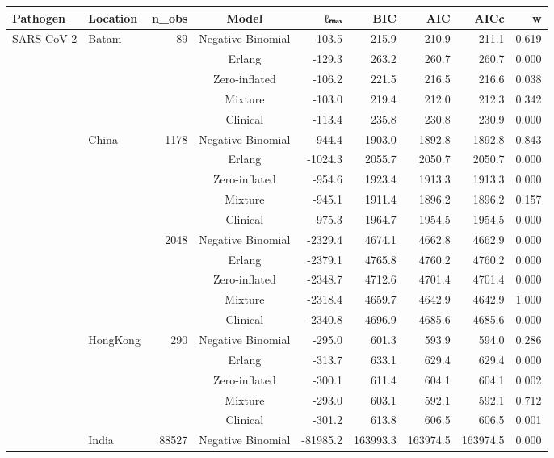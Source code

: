 \begin{table}[ht]
\centering
\begin{tabular}{llrcrrrrr}
  \hline
Pathogen & Location & n_obs & Model & ℓₘₐₓ & BIC & AIC & AICc & w \\ 
  \hline
SARS-CoV-2 & Batam & 89 & Negative Binomial & -103.5 & 215.9 & 210.9 & 211.1 & 0.619 \\ 
   &  &  & Erlang & -129.3 & 263.2 & 260.7 & 260.7 & 0.000 \\ 
   &  &  & Zero-inflated & -106.2 & 221.5 & 216.5 & 216.6 & 0.038 \\ 
   &  &  & Mixture & -103.0 & 219.4 & 212.0 & 212.3 & 0.342 \\ 
   &  &  & Clinical & -113.4 & 235.8 & 230.8 & 230.9 & 0.000 \\ 
   & China & 1178 & Negative Binomial & -944.4 & 1903.0 & 1892.8 & 1892.8 & 0.843 \\ 
   &  &  & Erlang & -1024.3 & 2055.7 & 2050.7 & 2050.7 & 0.000 \\ 
   &  &  & Zero-inflated & -954.6 & 1923.4 & 1913.3 & 1913.3 & 0.000 \\ 
   &  &  & Mixture & -945.1 & 1911.4 & 1896.2 & 1896.2 & 0.157 \\ 
   &  &  & Clinical & -975.3 & 1964.7 & 1954.5 & 1954.5 & 0.000 \\ 
   &  & 2048 & Negative Binomial & -2329.4 & 4674.1 & 4662.8 & 4662.9 & 0.000 \\ 
   &  &  & Erlang & -2379.1 & 4765.8 & 4760.2 & 4760.2 & 0.000 \\ 
   &  &  & Zero-inflated & -2348.7 & 4712.6 & 4701.4 & 4701.4 & 0.000 \\ 
   &  &  & Mixture & -2318.4 & 4659.7 & 4642.9 & 4642.9 & 1.000 \\ 
   &  &  & Clinical & -2340.8 & 4696.9 & 4685.6 & 4685.6 & 0.000 \\ 
   & HongKong & 290 & Negative Binomial & -295.0 & 601.3 & 593.9 & 594.0 & 0.286 \\ 
   &  &  & Erlang & -313.7 & 633.1 & 629.4 & 629.4 & 0.000 \\ 
   &  &  & Zero-inflated & -300.1 & 611.4 & 604.1 & 604.1 & 0.002 \\ 
   &  &  & Mixture & -293.0 & 603.1 & 592.1 & 592.1 & 0.712 \\ 
   &  &  & Clinical & -301.2 & 613.8 & 606.5 & 606.5 & 0.001 \\ 
   & India & 88527 & Negative Binomial & -81985.2 & 163993.3 & 163974.5 & 163974.5 & 0.000 \\ 

\end{tabular}
\end{table}
